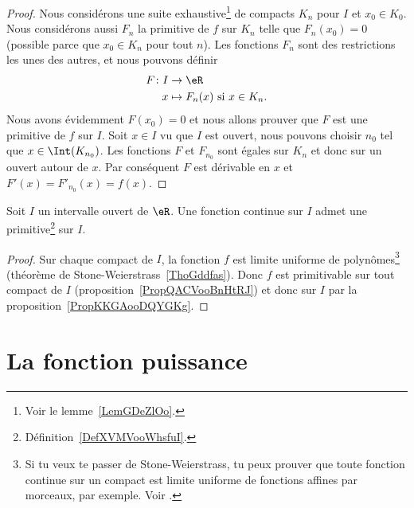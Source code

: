 \begin{proof}
    Nous considérons une suite exhaustive\footnote{Voir le lemme~\ref{LemGDeZlOo}.} de compacts \( K_n\) pour \( I\) et \( x_0\in K_0\). Nous considérons aussi \( F_n\) la primitive de \( f\) sur \( K_n\) telle que \( F_n(x_0)=0\) (possible parce que \( x_0\in K_n\) pour tout \( n\)). Les fonctions \( F_n\) sont des restrictions les unes des autres, et nous pouvons définir
    \begin{equation}
        \begin{aligned}
            F\colon I&\to \eR \\
            x&\mapsto F_n(x)\text{ si } x\in K_n.
        \end{aligned}
    \end{equation}
    Nous avons évidemment \( F(x_0)=0\) et nous allons prouver que \( F\) est une primitive de \( f\) sur \( I\). Soit \( x\in I\) vu que \( I\) est ouvert, nous pouvons choisir \( n_0\) tel que \( x\in\Int(K_{n_0})\). Les fonctions \( F\) et \( F_{n_0}\) sont égales sur \( K_n\) et donc sur un ouvert autour de \( x\). Par conséquent \( F\) est dérivable en \( x\) et \( F'(x)=F'_{n_0}(x)=f(x)\).
\end{proof}

\begin{theorem}    \label{ThoEXXyooCLwgQg}
    Soit \( I\) un intervalle ouvert de \( \eR\). Une fonction continue sur \( I\) admet une primitive\footnote{Définition~\ref{DefXVMVooWhsfuI}.} sur \( I\).
\end{theorem}

\begin{proof}
    Sur chaque compact de \( I\), la fonction \( f\) est limite uniforme de polynômes\footnote{Si tu veux te passer de Stone-Weierstrass, tu peux prouver que toute fonction continue sur un compact est limite uniforme de fonctions affines par morceaux, par exemple. Voir \cite{MQKDooSuEGxk}.} (théorème de Stone-Weierstrass~\ref{ThoGddfas}). Donc \( f\) est primitivable sur tout compact de \( I\) (proposition~\ref{PropQACVooBnHtRJ}) et donc sur \( I\) par la proposition~\ref{PropKKGAooDQYGKg}.
\end{proof}

\section{La fonction puissance}

